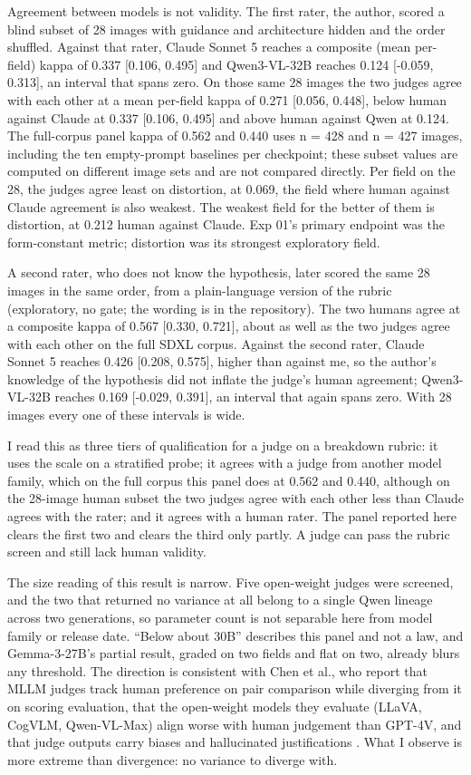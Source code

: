 \documentclass[11pt]{article}
\begin{document}
Agreement between models is not validity. The first rater, the author, scored a
blind subset of 28 images with guidance and architecture hidden and the order
shuffled. Against that rater, Claude Sonnet 5 reaches a composite (mean
per-field) kappa of 0.337 {[}0.106, 0.495{]} and Qwen3-VL-32B reaches 0.124
{[}-0.059, 0.313{]}, an interval that spans zero. On those same 28 images the
two judges agree with each other at a mean per-field kappa of 0.271 {[}0.056,
0.448{]}, below human against Claude at 0.337 {[}0.106, 0.495{]} and above human
against Qwen at 0.124. The full-corpus panel kappa of 0.562 and 0.440 uses n =
428 and n = 427 images, including the ten empty-prompt baselines per checkpoint;
these subset values are computed on different image sets and are not compared
directly. Per field on the 28, the judges agree least on distortion, at 0.069,
the field where human against Claude agreement is also weakest. The weakest
field for the better of them is distortion, at 0.212 human against Claude. Exp
01's primary endpoint was the form-constant metric; distortion was its strongest
exploratory field.

A second rater, who does not know the hypothesis, later scored the same 28
images in the same order, from a plain-language version of the rubric
(exploratory, no gate; the wording is in the repository). The two humans agree
at a composite kappa of 0.567 {[}0.330, 0.721{]}, about as well as the two
judges agree with each other on the full SDXL corpus. Against the second rater,
Claude Sonnet 5 reaches 0.426 {[}0.208, 0.575{]}, higher than against me, so the
author's knowledge of the hypothesis did not inflate the judge's human
agreement; Qwen3-VL-32B reaches 0.169 {[}-0.029, 0.391{]}, an interval that
again spans zero. With 28 images every one of these intervals is wide.

I read this as three tiers of qualification for a judge on a breakdown rubric:
it uses the scale on a stratified probe; it agrees with a judge from another
model family, which on the full corpus this panel does at 0.562 and 0.440,
although on the 28-image human subset the two judges agree with each other less
than Claude agrees with the rater; and it agrees with a human rater. The panel
reported here clears the first two and clears the third only partly. A judge can
pass the rubric screen and still lack human validity.

The size reading of this result is narrow. Five open-weight judges were
screened, and the two that returned no variance at all belong to a single Qwen
lineage across two generations, so parameter count is not separable here from
model family or release date. ``Below about 30B'' describes this panel and not a
law, and Gemma-3-27B's partial result, graded on two fields and flat on two,
already blurs any threshold. The direction is consistent with Chen et al., who
report that MLLM judges track human preference on pair comparison while
diverging from it on scoring evaluation, that the open-weight models they
evaluate (LLaVA, CogVLM, Qwen-VL-Max) align worse with human judgement than
GPT-4V, and that judge outputs carry biases and hallucinated justifications
\citep{chen2024mllmjudge}. What I observe is more extreme than divergence: no
variance to diverge with.
\end{document}
